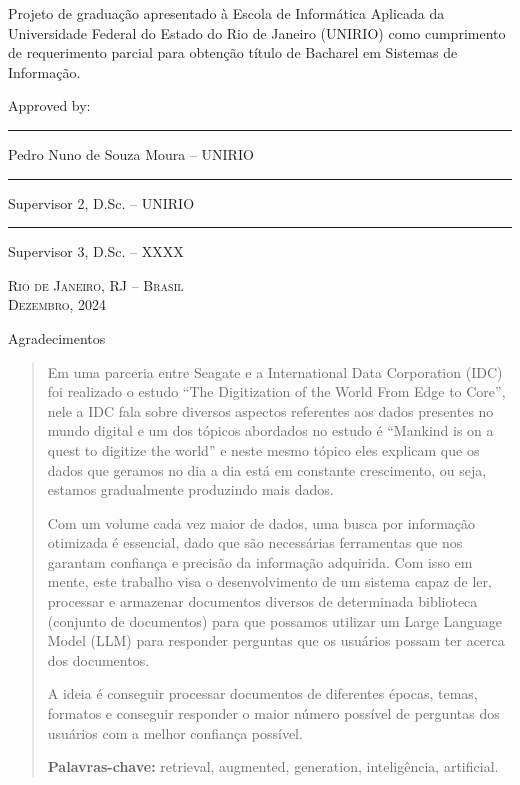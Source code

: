 \documentclass[a4paper, 12pt]{article}
\begin{document}
    \begin{flushright}
        \parbox{8.0cm}{
        Projeto de graduação apresentado à Escola de Informática Aplicada
        da Universidade Federal do Estado do Rio de Janeiro (UNIRIO) como
        cumprimento de requerimento parcial para obtenção título de Bacharel em
        Sistemas de Informação.}
        \vskip 1.5cm
        Approved by:
        \vskip 1.5cm
        \rule{10.0cm}{.1mm}

        Pedro Nuno de Souza Moura -- UNIRIO
        \vskip 1.0cm
        
        \rule{10.0cm}{.1mm}

        Supervisor 2, D.Sc. -- UNIRIO
        \vskip 1.0cm

        \rule{10.0cm}{.1mm}

        Supervisor 3, D.Sc. -- XXXX
        \vskip 1.0cm
    \end{flushright}
    \begin{center}
        \textsc{Rio de Janeiro, RJ -- Brasil} \\ \textsc{Dezembro, 2024}
    \end{center}

    \clearpage
    \begin{flushright}
        Agradecimentos
    \end{flushright}
    \lipsum[1-2]
    \clearpage

    \begin{abstract}
        Em uma parceria entre Seagate e a International Data Corporation (IDC) foi realizado o estudo “The Digitization of the World From Edge to Core”, nele a IDC fala sobre diversos aspectos referentes aos dados presentes no mundo digital e um dos tópicos abordados no estudo é “Mankind is on a quest to digitize the world” e neste mesmo tópico eles explicam que os dados que geramos no dia a dia está em constante crescimento, ou seja, estamos gradualmente produzindo mais dados.

        Com um volume cada vez maior de dados, uma busca por informação otimizada é essencial, dado que são necessárias ferramentas que nos garantam confiança e precisão da informação adquirida. Com isso em mente, este trabalho visa o desenvolvimento de um sistema capaz de ler, processar e armazenar documentos diversos de determinada biblioteca (conjunto de documentos) para que possamos utilizar um Large Language Model (LLM) para responder perguntas que os usuários possam ter acerca dos documentos.
        
        A ideia é conseguir processar documentos de diferentes épocas, temas, formatos e conseguir responder o maior número possível de perguntas dos usuários com a melhor confiança possível.

        \begin{flushleft}
            \textbf{Palavras-chave:} retrieval, augmented, generation, inteligência, artificial.
        \end{flushleft}
    \end{abstract}
    \clearpage
\end{document}
